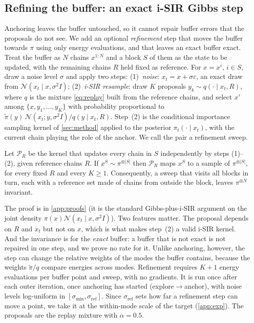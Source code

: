 \subsection{Refining the buffer: an exact i-SIR Gibbs step}
\label{sec:refine}
Anchoring leaves the buffer untouched, so it cannot repair buffer errors that the proposals do not see. We add an optional \emph{refinement} step that moves the buffer towards $\pi$ using only energy evaluations, and that leaves an exact buffer exact.
Treat the buffer as $N$ chains $x^{1:N}$ and a block $S$ of them as the state to be updated, with the remaining chains $R$ held fixed as reference.
For $x=x^i$, $i\in S$, draw a noise level $\sigma$ and apply two steps:
(1)~\emph{noise}: $x_t=x+\sigma\varepsilon$, an exact draw from $\mathcal{N}(x_t\mid x,\sigma^2I)$;
(2)~\emph{i-SIR resample}: draw $K$ proposals $y_k\sim q(\cdot\mid x_t,R)$, where $q$ is the mixture \eqref{eq:replay} built from the reference chains, and select $x'$ among $\{x,y_1,\dots,y_K\}$ with probability proportional to $\tilde\pi(y)\,\mathcal{N}(x_t;y,\sigma^2I)/q(y\mid x_t,R)$.
Step~(2) is the conditional importance sampling kernel of \cref{sec:method} applied to the posterior $\pi_t(\cdot\mid x_t)$, with the current chain playing the role of the anchor. We call the pair a refinement sweep.

\begin{proposition}
\label{prop:refine}
Let $\mathcal{P}_R$ be the kernel that updates every chain in $S$ independently by steps (1)--(2), given reference chains $R$. If $x^{S}\sim\pi^{\otimes|S|}$ then $\mathcal{P}_R$ maps $x^S$ to a sample of $\pi^{\otimes|S|}$, for every fixed $R$ and every $K\ge1$. Consequently, a sweep that visits all blocks in turn, each with a reference set made of chains from outside the block, leaves $\pi^{\otimes N}$ invariant.
\end{proposition}

\noindent The proof is in \cref{app:proofs} (it is the standard Gibbs-plus-i-SIR argument on the joint density $\pi(x)\mathcal{N}(x_t\mid x,\sigma^2I)$). Two features matter. The proposal depends on $R$ and $x_t$ but not on $x$, which is what makes step~(2) a valid i-SIR kernel. And the invariance is for the \emph{exact} buffer: a buffer that is not exact is not repaired in one step, and we prove no rate for it. Unlike anchoring, however, the step can change the relative weights of the modes the buffer contains, because the weights $\tilde\pi/q$ compare energies across modes.
Refinement requires $K{+}1$ energy evaluations per buffer point and sweep, with no gradients. It is run once after each outer iteration, once anchoring has started (explore$\to$anchor), with noise levels log-uniform in $[\sigma_{\min},\sigma_{\mathrm{ref}}]$. Since $\sigma_{\mathrm{ref}}$ sets how far a refinement step can move a point, we take it at the within-mode scale of the target (\cref{app:exp}). The proposals are the replay mixture with $\alpha=0.5$.



